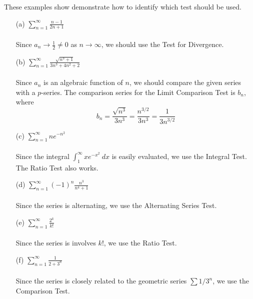   \begin{example}
    These examples show demonstrate how to identify which test should be used.
    \begin{enumerate}
      \item[(a)] $\displaystyle \sum_{n=1}^{\infty} \frac{n-1}{2n+1}$ \\~\\
      Since $a_n \to \frac{1}{2} \neq 0$ as $n\to\infty$, we should use the Test for Divergence.
      \item[(b)] $\displaystyle \sum_{n=1}^{\infty} \frac{\sqrt{n^3 + 1}}{3n^3 + 4n^2 + 2}$ \\~\\
      Since $a_n$ is an algebraic function of $n$, we should compare the given series with a $p$-series. The comparison series for the Limit Comparison Test is $b_n$, where
      $$b_n = \frac{\sqrt{n^3}}{3n^3} = \frac{n^{3/2}}{3n^3} = \frac{1}{3n^{3/2}} $$
      \item[(c)] $\displaystyle \sum_{n=1}^{\infty} ne^{-n^2}$ \\~\\
      Since the integral $\int_{1}^{\infty} xe^{-x^2}\ dx$ is easily evaluated, we use the Integral Test. The Ratio Test also works.
      \item[(d)] $\displaystyle \sum_{n=1}^{\infty} (-1)^n \frac{n^3}{n^4 + 1}$ \\~\\
      Since the series is alternating, we use the Alternating Series Test.
      \item[(e)] $\displaystyle \sum_{n=1}^{\infty} \frac{2^k}{k!}$ \\~\\
      Since the series is involves $k!$, we use the Ratio Test.
      \item[(f)] $\displaystyle \sum_{n=1}^{\infty} \frac{1}{2+3^n}$ \\~\\
      Since the series is closely related to the geometric series $\sum 1/3^n$, we use the Comparison Test.
    \end{enumerate}
  \end{example}

